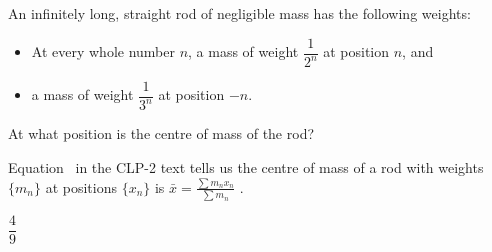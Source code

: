 \begin{Mquestion}
An infinitely long, straight rod of negligible mass has the following weights:
\begin{itemize}
\item At every whole number $n$, a mass of weight $\dfrac{1}{2^n}$ at position $n$, and
\item a mass of weight $\dfrac{1}{3^n}$ at position $-n$.
\end{itemize}
At what position is the centre of mass of the rod?
\begin{center}
\end{center}

\end{Mquestion}
\begin{hint}
Equation~ in the CLP-2 text tells us the centre of mass of a rod with weights $\{m_n\}$ at positions $\{x_n\}$ is $\displaystyle\bar x =\frac{\sum m_nx_n}{\sum m_n}$ .
\end{hint}
\begin{answer}
	$\dfrac{4}{9}$
\end{answer}

